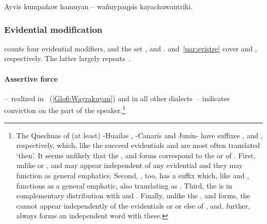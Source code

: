 %
{Ayvis kumpañaw hamuyan -- wañuypaqpis kayachuwantriki.}%
{}%
{}{}%

\subsubsection{Evidential modification}\label{ssec:evidmodifi}
\SYQ{} counts four evidential modifiers,  and the set \uo,  and .  and~\ref{par:evistre} cover  and , respectively. The latter largely repeats~\citet{Shimelman12}.

\paragraph{Assertive force }\label{par:assertive}
 --~realized  in \CH{}~(\ref{Glo6:Wayrakuyan}) and  in all other dialects~-- indicates conviction on the part of the speaker.\footnote{The Quechuas of (at least) -Huailas \citet[151]{Parker76gram}, -Canaris \citet[158]{Quesada76} and Junin- \citet[238--9]{CerroP76a} have suffixes ,  and , respectively, which, like the \SYQ{}  succeed evidentials and are most often translated  ‘then’. It seems unlikely that the ,  and  forms correspond to the  or  of \SYQ. First, unlike  or ,  and  may appear independent of any evidential and they may function as general emphatics. Second, \SYQ, too, has a suffix  which, like  and , functions as a general emphatic, also translating as . Third, the \SYQ{}  is in complementary distribution with  and . Finally, unlike the ,  and  forms, the \SYQ{}  cannot appear independently of the evidentials  or  or else of , and, further, always forms an independent word with these.} 


